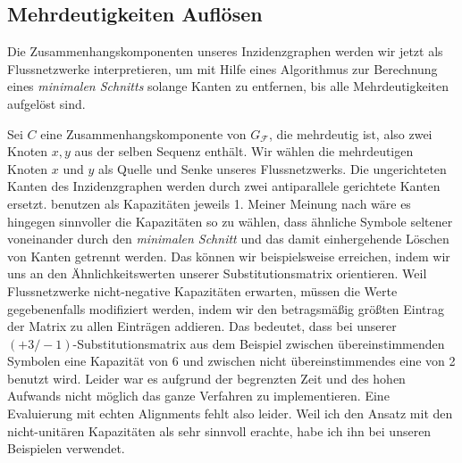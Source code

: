\begin{center}
\end{center}

\subsection{Mehrdeutigkeiten Auflösen}

Die Zusammenhangskomponenten unseres Inzidenzgraphen werden wir jetzt als Flussnetzwerke interpretieren, um mit Hilfe eines Algorithmus zur Berechnung eines \emph{minimalen Schnitts} solange Kanten zu entfernen, bis alle Mehrdeutigkeiten aufgelöst sind.

Sei $C$ eine Zusammenhangskomponente von $G_{\mathcal{F}}$, die mehrdeutig ist, also zwei Knoten $x,y$ aus der selben Sequenz enthält. Wir wählen die mehrdeutigen Knoten $x$ und $y$ als Quelle und Senke unseres Flussnetzwerks. Die ungerichteten Kanten des Inzidenzgraphen werden durch zwei antiparallele gerichtete Kanten ersetzt. \cite{cpm10} benutzen als Kapazitäten jeweils 1. Meiner Meinung nach wäre es hingegen sinnvoller die Kapazitäten so zu wählen, dass ähnliche Symbole seltener voneinander durch den \emph{minimalen Schnitt} und das damit einhergehende Löschen von Kanten getrennt werden. Das können wir beispielsweise erreichen, indem wir uns an den Ähnlichkeitswerten unserer Substitutionsmatrix orientieren. Weil Flussnetzwerke nicht-negative Kapazitäten erwarten, müssen die Werte gegebenenfalls modifiziert werden, indem wir den betragsmäßig größten Eintrag der Matrix zu allen Einträgen addieren. Das bedeutet, dass bei unserer $(+3/-1)$-Substitutionsmatrix aus dem Beispiel zwischen übereinstimmenden Symbolen eine Kapazität von 6 und zwischen nicht übereinstimmendes eine von 2 benutzt wird. Leider war es aufgrund der begrenzten Zeit und des hohen Aufwands nicht möglich das ganze Verfahren zu implementieren. Eine Evaluierung mit echten Alignments fehlt also leider. Weil ich den Ansatz mit den nicht-unitären Kapazitäten als sehr sinnvoll erachte, habe ich ihn bei unseren Beispielen verwendet.

